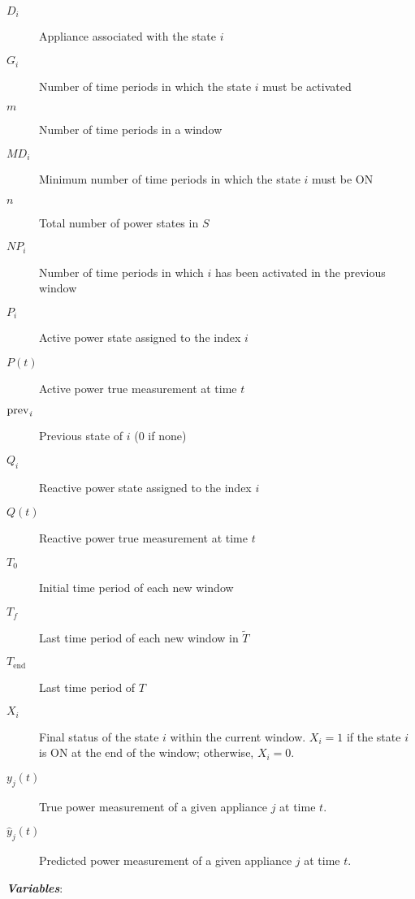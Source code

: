 \begin{description}

    \item [{$D_i$}]     Appliance associated with the state $i$
    \item [{$G_i$}]     Number of time periods in which the state $i$ must be activated
    \item [{$m$}]       Number of time periods in a window
    \item [{$MD_i$}]    Minimum number of time periods in which the state $i$ must be ON
    \item [{$n$}]       Total number of power states in $S$
    \item [{$NP_i$}]    Number of time periods in which $i$ has been activated in the previous window
    \item [{$P_i$}]     Active power state assigned to the index $i$
    \item [{$P(t)$}]    Active power true measurement at time $t$
    \item [{$\rm{prev}_\textit{i}$}]Previous state of $i$ (0 if none)
    \item [{$Q_i$}]     Reactive power state assigned to the index $i$
    \item [{$Q(t)$}]    Reactive power true measurement at time $t$
    \item [{$T_0$}]     Initial time period of each new window
    \item [{$T_f$}]     Last time period of each new window in $\tilde{T}$
    \item [{$T_{\text{end}}$}] Last time period of $T$ 
    \item [{$X_i$}]     Final status of the state $i$ within the current window. $X_i=1$ if the state $i$ is ON at the end of the window; otherwise, $X_i=0$.

    \item [{$y_j(t)$}]     True power measurement of a given appliance $j$ at time $t$.
    \item [{$\hat{y}_j(t)$}]     Predicted power measurement of a given appliance $j$ at time $t$.

\end{description}

\vspace{4pt}

\noindent \emph{\textbf{Variables}}:

\vspace{4pt}

